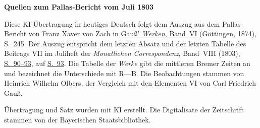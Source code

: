 \clearpage\thispagestyle{empty}
\begin{center}\textbf{Quellen zum Pallas-Bericht vom Juli 1803}\end{center}
\noindent Diese KI-Übertragung in heutiges Deutsch folgt dem Auszug aus dem Pallas-Bericht von Franz Xaver von Zach in \href{https://gdz.sub.uni-goettingen.de/id/PPN236007467}{Gauß’ \textit{Werken}, Band~VI} (Göttingen, 1874), S.~245. Der Auszug entspricht dem letzten Absatz und der letzten Tabelle des Beitrags VII im Juliheft der \textit{Monatlichen Correspondenz}, Band~VIII (1803), \href{https://api.digitale-sammlungen.de/iiif/image/v2/bsb10538600_00096/full/1450,/0/default.jpg}{S.~90--93}, auf \href{https://api.digitale-sammlungen.de/iiif/image/v2/bsb10538600_00099/full/1450,/0/default.jpg}{S.~93}. Die Tabelle der \textit{Werke} gibt die mittleren Bremer Zeiten an und bezeichnet die Unterschiede mit R—B. Die Beobachtungen stammen von Heinrich Wilhelm Olbers, der Vergleich mit den Elementen VI von Carl Friedrich Gauß.
\par\smallskip\noindent Übertragung und Satz wurden mit KI erstellt. Die Digitalisate der Zeitschrift stammen von der Bayerischen Staatsbibliothek.
\clearpage
